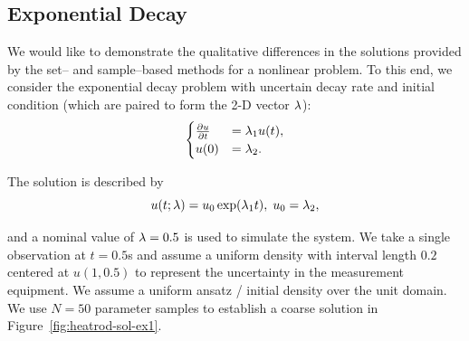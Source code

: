 
\subsection{Exponential Decay}\label{ex:decay-set-sample}

We would like to demonstrate the qualitative differences in the solutions provided by the set-- and sample--based methods for a nonlinear problem.
To this end, we consider the exponential decay problem with uncertain decay rate and initial condition (which are paired to form the 2-D vector $\lambda$):
$$
\begin{cases}
  \frac{\partial u}{\partial t} & = \lambda_1 u(t), \\
  u(0) &= \lambda_2.
\end{cases}
$$

The solution is described by
\begin{equation}
  u(t;\lambda) = u_0\exp(\lambda_1 t), \; u_0 = \lambda_2 ,
\end{equation}

and a nominal value of $\lambda = 0.5$ is used to simulate the system.
We take a single observation at $t=0.5$s and assume a uniform density with interval length $0.2$ centered at $u(1,0.5)$ to represent the uncertainty in the measurement equipment.
We assume a uniform ansatz / initial density over the unit domain.
We use $N=50$ parameter samples to establish a coarse solution in Figure~\ref{fig:heatrod-sol-ex1}.



